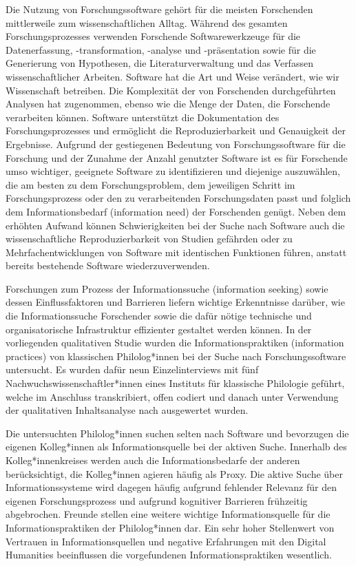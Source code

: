 \documentclass[12pt, a4paper, titlepage, oneside, abstract=true, toc=listof, toc=bibliography, BCOR=1cm]{scrreprt}
\begin{document}
{%
Die Nutzung von Forschungssoftware gehört für die meisten Forschenden mittlerweile zum wissenschaftlichen Alltag. Während des gesamten Forschungsprozesses verwenden Forschende Softwarewerkzeuge für die Da\-ten\-erfassung, -transformation, -analyse und -präsentation sowie für die Generierung von Hypothesen, die Literaturverwaltung und das Verfassen wissenschaftlicher Arbeiten. Software hat die Art und Weise verändert, wie wir Wissenschaft betreiben. Die Komplexität der von Forschenden durchgeführten Analysen hat zugenommen, ebenso wie die Menge der Daten, die Forschende verarbeiten können. Software unterstützt die Dokumentation des Forschungsprozesses und ermöglicht die Reproduzierbarkeit und Genauigkeit der Ergebnisse. Aufgrund der gestiegenen Bedeutung von Forschungssoftware für die Forschung und der Zunahme der Anzahl genutzter Software ist es für Forschende umso wichtiger, geeignete Software zu identifizieren und diejenige auszuwählen, die am besten zu dem Forschungsproblem, dem jeweiligen Schritt im Forschungsprozess oder den zu verarbeitenden Forschungsdaten passt und folglich dem Informationsbedarf (information need) der Forschenden genügt. Neben dem erhöhten Aufwand können Schwierigkeiten bei der Suche nach Software auch die wissenschaftliche Reproduzierbarkeit von Studien gefährden oder zu Mehrfachentwicklungen von Software mit identischen Funktionen führen, anstatt bereits bestehende Software wiederzuverwenden.

Forschungen zum Prozess der Informationssuche (information seeking) sowie dessen Einflussfaktoren und Barrieren liefern wichtige Erkenntnisse darüber, wie die Informationssuche Forschender sowie die dafür nötige technische und organisatorische Infrastruktur effizienter gestaltet werden können.
In der vorliegenden qualitativen Studie wurden die Informationspraktiken (information practices) von klassischen Philolog*innen bei der Suche nach Forschungssoftware untersucht. Es wurden dafür neun Einzelinterviews mit fünf Nachwuchswissenschaftler*innen eines Instituts für klassische Philologie geführt, welche im Anschluss transkribiert, offen codiert und danach unter Verwendung der qualitativen Inhaltsanalyse nach \citet{Mayring2014} ausgewertet wurden. 

Die untersuchten Philolog*innen suchen selten nach Software und bevorzugen die eigenen Kolleg*innen als Informationsquelle bei der aktiven Suche. Innerhalb des Kolleg*innenkreises werden auch die Informationsbedarfe der anderen berücksichtigt, die Kolleg*innen agieren häufig als Proxy. Die aktive Suche über Informationssysteme wird dagegen häufig aufgrund fehlender Relevanz für den eigenen Forschungsprozess und aufgrund kognitiver Barrieren frühzeitig abgebrochen. Freunde stellen eine weitere wichtige Informationsquelle für die Informationspraktiken der Philolog*innen dar. Ein sehr hoher Stellenwert von Vertrauen in Informationsquellen und negative Erfahrungen mit den Digital Humanities beeinflussen die vorgefundenen Informationspraktiken wesentlich.

}
\end{document}
